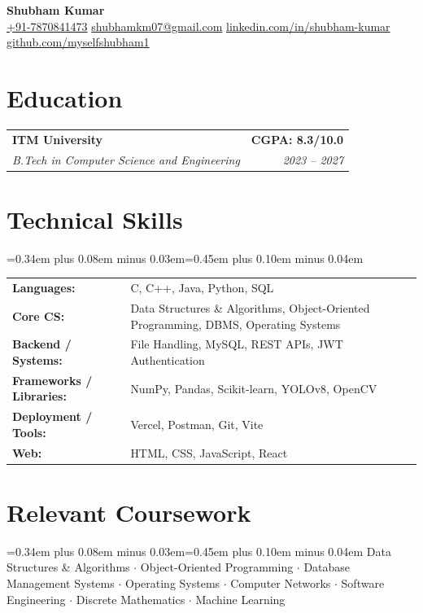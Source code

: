 \documentclass[a4paper,9pt]{extarticle}
\makeatletter
\newcommand{\resumeTextSpacing}{\setlength{\baselineskip}{11.45pt}\spaceskip=0.34em plus 0.08em minus 0.03em\xspaceskip=0.45em plus 0.10em minus 0.04em}
\newcommand{\contactSep}{\hspace{0.5em}{\color{rulegray}|}\hspace{0.5em}}
\newcommand{\resumeSubheading}[4]{
  \vspace{2pt}
  \begin{tabularx}{\textwidth}{@{}Xr@{}}
    \textbf{\color{textgray}#1} & \textbf{\small #2} \\
    {\small\textit{#3}} & {\small\textit{#4}} \\
  \end{tabularx}
  \vspace{-4pt}
}
\newcommand{\skillrow}[2]{
  \textbf{#1} & \hspace{0.35em}#2 \\
}
\makeatother
\begin{document}
\begin{center}
  {\Huge\bfseries\color{accent} Shubham Kumar}\\[3pt]
  \small
  \href{tel:+917870841473}{+91-7870841473}
  \contactSep
  \href{mailto:shubhamkm07@gmail.com}{shubhamkm07@gmail.com}
  \contactSep
  \href{https://www.linkedin.com/in/shubham-kumar-05a9a5285/}{linkedin.com/in/shubham-kumar}
  \contactSep
  \href{https://github.com/myselfshubham1}{github.com/myselfshubham1}
\end{center}
\vspace{-3pt}

\section{Education}
\resumeSubheading
  {ITM University}{CGPA: 8.3/10.0}
  {B.Tech in Computer Science and Engineering}{2023 -- 2027}

\section{Technical Skills}
\fontsize{9.4}{10.2}\selectfont\resumeTextSpacing
\begingroup
\renewcommand{\arraystretch}{1.22}
\begin{tabularx}{\textwidth}{@{}p{1.6in}X@{}}
  \skillrow{Languages:}{C, C++, Java, Python, SQL}
  \skillrow{Core CS:}{Data Structures \& Algorithms, Object-Oriented Programming, DBMS, Operating Systems}
  \skillrow{Backend / Systems:}{File Handling, MySQL, REST APIs, JWT Authentication}
  \skillrow{Frameworks / Libraries:}{NumPy, Pandas, Scikit-learn, YOLOv8, OpenCV} %
  \skillrow{Deployment / Tools:}{Vercel, Postman, Git, Vite}
  \skillrow{Web:}{HTML, CSS, JavaScript, React}
\end{tabularx}
\endgroup

\section{Relevant Coursework}
\resumeTextSpacing
Data Structures \& Algorithms $\cdot$ Object-Oriented Programming $\cdot$ Database Management Systems $\cdot$ Operating Systems $\cdot$ Computer Networks $\cdot$ Software Engineering $\cdot$ Discrete Mathematics $\cdot$ Machine Learning
\end{document}
